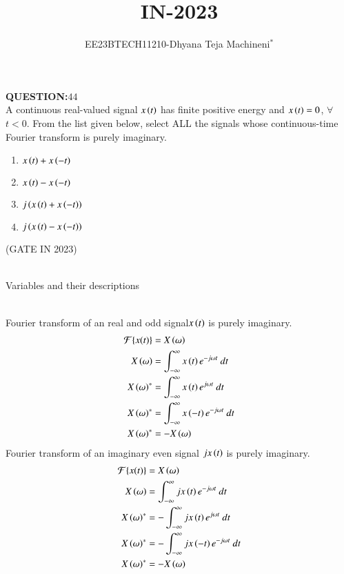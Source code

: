 \documentclass[journal,12pt,twocolumn]{IEEEtran}
\theoremstyle{remark}
\begin{document}

\vspace{3cm}
\title{\textbf{IN-2023}}
\author{EE23BTECH11210-Dhyana Teja Machineni$^{*}$%
}
\maketitle
\newpage
\bigskip

\textbf{QUESTION:$44$}\\
A continuous real-valued signal $x\left(t\right)$ has finite positive energy and $x\left(t\right) = 0$, $\forall$ $t < 0$. From the list given below, select ALL the signals whose
continuous-time Fourier transform is purely imaginary.\\
\begin{enumerate}
\item$x\left(t\right) + x\left(-t\right)$
\item$x\left(t\right) - x\left(-t\right)$
\item$j\left(x\left(t\right) + x\left(-t\right)\right)$
\item$j\left(x\left(t\right) - x\left(-t\right)\right)$
\end{enumerate}
\hfill{(GATE IN 2023)}\\
\solution\\
\begin{table}[h]
         \label{tab:table}
         
         \caption{Variables and their descriptions}
     \end{table}\\
Fourier transform of an real and odd signal$x\left(t\right)$ is purely imaginary.\\
\begin{align}
\mathcal{F}\{x(t)\} &= X\brak{\omega}\\
X\brak{\omega}&=\int_{-\infty}^{\infty} x\brak{t} e^{-j \omega t} \ dt\\
X\brak{\omega}^*&=\int_{-\infty}^{\infty} x\brak{t} e^{j \omega t} \ dt\\
X\brak{\omega}^*&=\int_{-\infty}^{\infty} x\brak{-t} e^{-j \omega t} \ dt\\
X\brak{\omega}^*&=-X\brak{\omega}
\end{align}
 Fourier transform of an imaginary even signal $jx\left(t\right)$ is purely imaginary.\\
\begin{align}
\mathcal{F}\{x(t)\} &= X\brak{\omega}\\
X\brak{\omega}&=\int_{-\infty}^{\infty} jx\brak{t} e^{-j \omega t} \ dt\\
X\brak{\omega}^*&=-\int_{-\infty}^{\infty} jx\brak{t} e^{j \omega t} \ dt\\
X\brak{\omega}^*&=-\int_{-\infty}^{\infty} jx\brak{-t} e^{-j \omega t} \ dt\\
X\brak{\omega}^*&=-X\brak{\omega}
\end{align}
\end{document}
